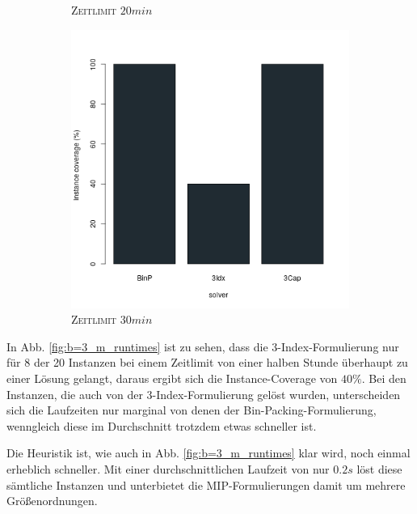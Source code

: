 \begin{figure}[H]
\begin{subfigure}[b]{0.3\textwidth}
\caption{\textsc{Zeitlimit} $20min$}
\label{fig:instance_coverage_b=3_m_b}
\end{subfigure}
\hfill
\begin{subfigure}[b]{0.3\textwidth}
\centering
\includegraphics[width=1.2\textwidth]{img/solver_instance_coverage_b=3_m_1800s.png}
\caption{\textsc{Zeitlimit} $30min$}
\label{fig:instance_coverage_b=3_m_c}
\end{subfigure}

\caption{}
\label{fig:instance_coverage_b=3_m}
\end{figure}

In Abb. \ref{fig:b=3_m_runtimes} ist zu sehen, dass die 3-Index-Formulierung nur für 8 der 20 Instanzen
bei einem Zeitlimit von einer halben Stunde überhaupt zu einer Lösung gelangt, daraus ergibt sich die Instance-Coverage
von $40 \%$. Bei den Instanzen, die auch von der 3-Index-Formulierung gelöst wurden, unterscheiden sich die Laufzeiten
nur marginal von denen der Bin-Packing-Formulierung, wenngleich diese im Durchschnitt trotzdem etwas schneller ist.

Die Heuristik ist, wie auch in Abb. \ref{fig:b=3_m_runtimes} klar wird, noch einmal erheblich schneller.
Mit einer durchschnittlichen Laufzeit von nur $0.2s$ löst diese sämtliche Instanzen und unterbietet die MIP-Formulierungen
damit um mehrere Größenordnungen.

